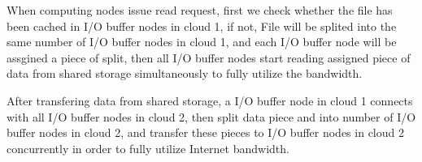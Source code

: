 \documentclass[JIP,draft]{ipsj}
\begin{document}
When computing nodes issue read request, first we check whether the file has been cached in I/O buffer nodes in cloud 1, if not, File will be splited into the same number of I/O buffer nodes in cloud 1, and each I/O buffer node will be assgined a piece of split, then all I/O buffer nodes start reading assigned piece of data from shared storage simultaneously to fully utilize the bandwidth.

After transfering data from shared storage, a I/O buffer node in cloud 1 connects with all I/O buffer nodes in cloud 2, then split data piece and into number of I/O buffer nodes in cloud 2, and transfer these pieces to I/O buffer nodes in cloud 2 concurrently in order to fully utilize Internet bandwidth.
\end{document}
